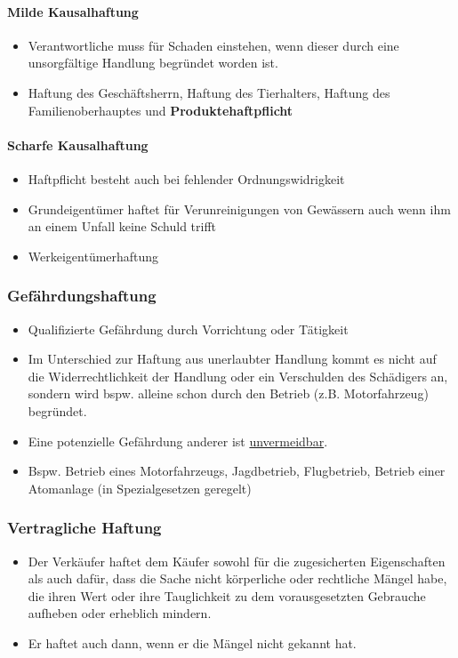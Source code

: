 \paragraph{Milde Kausalhaftung}
\begin{itemize}
    \item Verantwortliche muss für Schaden einstehen, wenn dieser durch eine unsorgfältige Handlung begründet worden ist.
    \item Haftung des Geschäftsherrn, Haftung des Tierhalters, Haftung des Familienoberhauptes und \textbf{Produktehaftpflicht}
\end{itemize}

\paragraph{Scharfe Kausalhaftung}
\begin{itemize}
    \item Haftpflicht besteht auch bei fehlender Ordnungswidrigkeit
    \item Grundeigentümer haftet für Verunreinigungen von Gewässern auch wenn ihm an einem Unfall keine Schuld trifft
    \item Werkeigentümerhaftung
\end{itemize}

\subsubsection{Gefährdungshaftung}
\begin{itemize}
    \item Qualifizierte Gefährdung durch Vorrichtung oder Tätigkeit
    \item Im Unterschied zur Haftung aus unerlaubter Handlung kommt es nicht auf die Widerrechtlichkeit der Handlung oder ein Verschulden des Schädigers an, sondern wird bspw. alleine schon durch den Betrieb (z.B. Motorfahrzeug) begründet.
    \item Eine potenzielle Gefährdung anderer ist \underline{unvermeidbar}.
    \item Bspw. Betrieb eines Motorfahrzeugs, Jagdbetrieb, Flugbetrieb, Betrieb einer Atomanlage (in Spezialgesetzen geregelt)
\end{itemize}

\newpage

\subsubsection{Vertragliche Haftung}
\begin{itemize}
    \item Der Verkäufer haftet dem Käufer sowohl für die zugesicherten Eigenschaften als auch dafür, dass die Sache nicht körperliche oder rechtliche Mängel habe, die ihren Wert oder ihre Tauglichkeit zu dem vorausgesetzten Gebrauche aufheben oder erheblich mindern.
    \item Er haftet auch dann, wenn er die Mängel nicht gekannt hat.
\end{itemize}

